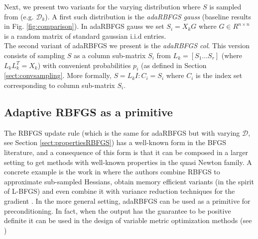 \documentclass[12pt,conference,compsocconf]{IEEEtran}
\begin{document}
Next, we present two variants for the varying distribution where $S$ is sampled from (e.g. $\mathcal{D}_k$). A first such distribution is the \textit{adaRBFGS gauss} (baseline results in Fig. \ref{fig:comparison}). In adaRBFGS gauss we set $S_i=X_kG$ where $G \in R^{n\times n}$ is a random matrix of standard gaussian i.i.d entries.\\
The second variant of adaRBFGS we present is the \textit{adaRBFGS col}. This version consists of sampling $S$ as a column sub-matrix $S_i$ from $L_k=[S_1\ldots S_r]$ (where $L_kL_k^T=X_k$) with convenient probabilities $p_i$ (as defined in Section \ref{sect:convsampling}. More formally, $S=L_kI{:C_i}=S_i$ where $C_i$ is the index set corresponding to column sub-matrix $S_i$.

\subsection{Adaptive RBFGS as a primitive}\label{sect:primitive}
The RBFGS update rule (which is the same for adaRBFGS but with varying $\mathcal{D}$, see Section \ref{sect:propertiesRBFGS}) has a well-known form in the BFGS literature, and a consequence of this form is that it can be composed in a larger setting to get methods with well-known properties in the quasi Newton family. A concrete example is the work in \cite{Gower3} where the authors combine RBFGS to approximate sub-sampled Hessians, obtain memory efficient variants (in the spirit of L-BFGS) and even combine it with variance reduction techniques for the gradient \cite{variancereduct}. In the more general setting, adaRBFGS can be used as a primitive for preconditioning. In fact, when the output has the guarantee to be positive definite it can be used in the design of variable metric optimization methods (see \cite{Stich1,Leventhal})
\end{document}
